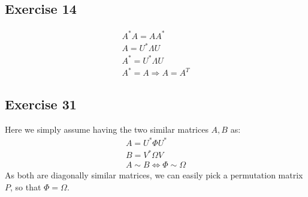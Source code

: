 \subsection{Exercise 14}
\begin{gather*}
A^* A = A A^*\\
A = U ^* \Lambda U\\
A^* =  U ^* \Lambda U \\
A^* = A \Rightarrow A = A^T
\end{gather*}
\subsection{Exercise 31}
Here we simply assume having the two similar matrices $A,B$ as:
\begin{gather*}
A = U^* \Phi U^* \\
B = V^* \Omega V \\
A \sim B \Leftrightarrow \Phi \sim \Omega
\end{gather*}
As both are diagonally similar matrices, we can easily pick a permutation matrix $P$, so that $\Phi = \Omega$.